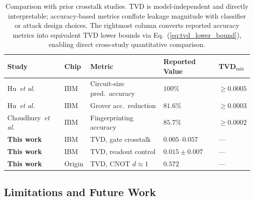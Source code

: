 \documentclass[ASNA,twocolumn]{USG}
\begin{document}
\begin{table}[t]
\centering
\caption{Comparison with prior crosstalk studies. TVD is model-independent and directly interpretable; accuracy-based metrics conflate leakage magnitude with classifier or attack design choices. The rightmost column converts reported accuracy metrics into equivalent TVD lower bounds via Eq.~(\ref{eq:tvd_lower_bound}), enabling direct cross-study quantitative comparison.}
\label{tab:prior_comparison}
\scriptsize
\begin{tabular}{p{1.7cm}p{0.9cm}p{2.6cm}p{1.1cm}p{1.1cm}}
\toprule
Study & Chip & Metric & Reported Value & TVD$_{\mathrm{min}}$ \\
\midrule
Hu~\emph{et al.}~\cite{hu2025swap} & IBM & Circuit-size pred.~accuracy & $100\%$ & $\geq 0.0005$ \\
Hu~\emph{et al.}~\cite{hu2025swap} & IBM & Grover acc.~reduction & $81.6\%$ & $\geq 0.0003$ \\
Choudhury~\emph{et al.}~\cite{choudhury2024crosstalk} & IBM & Fingerprinting accuracy & $85.7\%$ & $\geq 0.0002$ \\
\midrule
\textbf{This work} & IBM & TVD, gate crosstalk & $\mathbf{0.005}$--$\mathbf{0.057}$ & --- \\
\textbf{This work} & IBM & TVD, readout control  & $\mathbf{0.015{\pm}0.007}$ & --- \\
\textbf{This work} & Origin & TVD, CNOT $d{\approx}1$ & $\mathbf{0.572}$ & --- \\
\bottomrule
\end{tabular}
\end{table}

\subsection{Limitations and Future Work}
\end{document}
